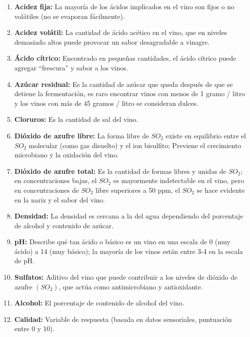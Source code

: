 \documentclass[
]{article}
\begin{document}
\begin{enumerate}
\def\labelenumi{\arabic{enumi}.}
\item
  \textbf{Acidez fija:} La mayoría de los ácidos implicados en el vino
  son fijos o no volátiles (no se evaporan fácilmente).
\item
  \textbf{Acidez volátil:} La cantidad de ácido acético en el vino, que
  en niveles demasiado altos puede provocar un sabor desagradable a
  vinagre.
\item
  \textbf{Ácido cítrico:} Encontrado en pequeñas cantidades, el ácido
  cítrico puede agregar ``frescura'' y sabor a los vinos.
\item
  \textbf{Azúcar residual:} Es la cantidad de azúcar que queda después
  de que se detiene la fermentación, es raro encontrar vinos con menos
  de 1 gramo / litro y los vinos con más de 45 gramos / litro se
  consideran dulces.
\item
  \textbf{Cloruros:} Es la cantidad de sal del vino.
\item
  \textbf{Dióxido de azufre libre:} La forma libre de \(SO_{2}\) existe
  en equilibrio entre el \(SO_{2}\) molecular (como gas disuelto) y el
  ion bisulfito; Previene el crecimiento microbiano y la oxidación del
  vino.
\item
  \textbf{Dióxido de azufre total:} Es la cantidad de formas libres y
  unidas de \(SO_{2}\); en concentraciones bajas, el \(SO_{2}\) es
  mayormente indetectable en el vino, pero en concentraciones de
  \(SO_{2}\) libre superiores a 50 ppm, el \(SO_{2}\) se hace evidente
  en la nariz y el sabor del vino.
\item
  \textbf{Densidad:} La densidad es cercana a la del agua dependiendo
  del porcentaje de alcohol y contenido de azúcar.
\item
  \textbf{pH:} Describe qué tan ácido o básico es un vino en una escala
  de 0 (muy ácido) a 14 (muy básico); la mayoría de los vinos están
  entre 3-4 en la escala de pH.
\item
  \textbf{Sulfatos:} Aditivo del vino que puede contribuir a los niveles
  de dióxido de azufre \((SO_{2})\), que actúa como antimicrobiano y
  antioxidante.
\item
  \textbf{Alcohol:} El porcentaje de contenido de alcohol del vino.
\item
  \textbf{Calidad:} Variable de respuesta (basada en datos sensoriales,
  puntuación entre 0 y 10).
\end{enumerate}
\end{document}
